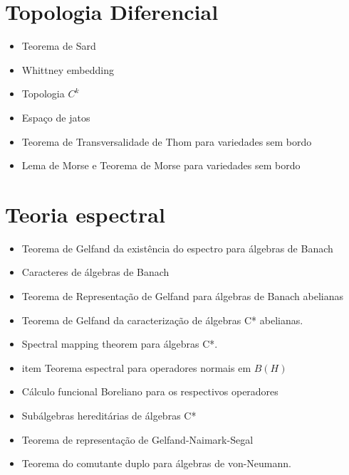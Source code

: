 \documentclass{article}
\begin{document}
\section{Topologia Diferencial}
\begin{itemize}
    \item Teorema de Sard 
    \item Whittney embedding 
    \item Topologia $C^k$ 
    \item Espaço de jatos 
   
    \item Teorema de Transversalidade de Thom para variedades sem bordo
    \item Lema de Morse e Teorema de Morse para variedades sem bordo
   
\end{itemize}


\section{Teoria espectral}

\begin{itemize}
    \item Teorema de Gelfand da existência do espectro para álgebras de Banach
    \item Caracteres de álgebras de Banach
    \item Teorema de Representação de Gelfand para álgebras de Banach abelianas
    \item Teorema de Gelfand da caracterização de álgebras C* abelianas.
    \item Spectral mapping theorem para álgebras C*.
    \item item Teorema espectral para operadores normais em $B(H)$
    \item Cálculo funcional Boreliano para os respectivos operadores
    \item Subálgebras hereditárias de álgebras C*
    \item Teorema de representação de Gelfand-Naimark-Segal
    \item Teorema do comutante duplo para álgebras de von-Neumann. 


\end{itemize}
\end{document}
